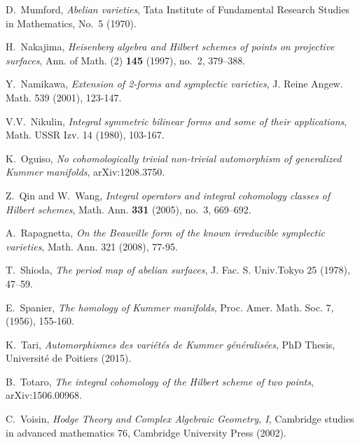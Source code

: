 \begin{thebibliography}{10}
D.~Mumford, \emph{Abelian varieties}, Tata Institute of Fundamental Research Studies in Mathematics, 
  No.~5 (1970).

H.~Nakajima, \emph{Heisenberg algebra and Hilbert schemes of points on
  projective surfaces}, Ann. of Math. (2) \textbf{145} (1997), no.~2, 379--388.

Y.~Namikawa,
\emph{Extension of 2-forms and symplectic varieties},
J. Reine Angew. Math. 
539 (2001), 123-147.

V.V.~Nikulin,
\emph{Integral symmetric bilinear forms and some of their applications},
Math. USSR Izv.
14 (1980), 103-167.

K.~Oguiso,
\emph{No cohomologically trivial non-trivial automorphism of generalized Kummer manifolds},
arXiv:1208.3750.

Z.~Qin and W.~Wang, \emph{Integral operators and integral cohomology classes of
  {H}ilbert schemes}, Math. Ann. \textbf{331} (2005), no.~3, 669--692.

A.~Rapagnetta,
\emph{On the Beauville form of the known irreducible symplectic varieties},
Math. Ann.
321 (2008), 77-95.


T.~Shioda, \emph{The period map of abelian surfaces}, J. Fac. S. Univ.Tokyo 25 (1978), 47--59.

E.~Spanier, 
\emph{The homology of Kummer manifolds},
Proc. Amer. Math. Soc.
7, (1956), 155-160.

K.~Tari, 
\emph{Automorphismes des vari\'et\'es de Kummer g\'en\'eralis\'ees},
PhD Thesis, Universit\'e de Poitiers (2015).

B.~Totaro, \emph{The integral cohomology of the Hilbert scheme of two points}, arXiv:1506.00968.

C.~Voisin, \emph{Hodge Theory and Complex Algebraic Geometry, I},
  Cambridge studies in advanced mathematics 76, Cambridge University Press (2002).

\end{thebibliography}
